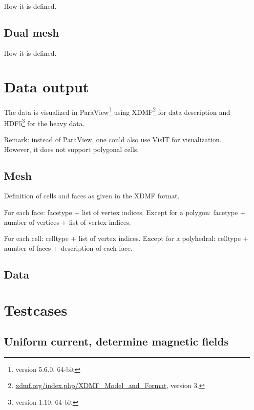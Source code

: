 \documentclass{article}
\begin{document}
How it is defined.



\subsection{Dual mesh}

How it is defined.



\section{Data output}

The data is visualized in ParaView\footnote{version 5.6.0, 64-bit} 
using XDMF\footnote{\url{xdmf.org/index.php/XDMF_Model_and_Format}, version 3.} 
for data description and HDF5\footnote{version 1.10, 64-bit} 
for the heavy data.

Remark: instead of ParaView, one could also use VisIT for visualization. However, it does not support polygonal cells. 






\subsection{Mesh}

Definition of cells and faces as given in the XDMF format. 

For each face: facetype + list of vertex indices. Except for a polygon: facetype + number of vertices + list of vertex indices.

For each cell: celltype + list of vertex indices. Except for a polyhedral: celltype + number of faces + description of each face.




\subsection{Data}



\section{Testcases}


\subsection{Uniform current, determine magnetic fields}
\end{document}
